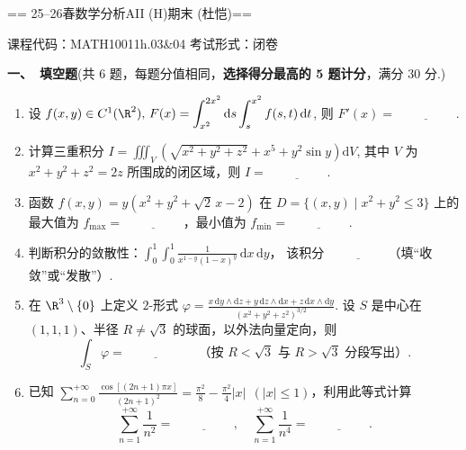 
== 25--26春数学分析AII (H)期末 (杜恺)==

\begin{center}
课程代码：MATH10011h.03&04 \quad 考试形式：闭卷
\end{center}

\textbf{一、\ 填空题}(共 6 题，每题分值相同，\textbf{选择得分最高的 5 题计分}，满分 30 分.)
\begin{enumerate}
\item 设 $f(x,y)\in C^1(\R^2),\,\displaystyle F(x)=\int_{x^2}^{2x^2}\mathrm{d} s\int_s^{x^2}f(s,t)\,\mathrm{d} t$,
则 $F'(x)=\underline{\hspace{2cm}}$.

\item 计算三重积分 $\displaystyle I=\iiint_V\left(\sqrt{x^2+y^2+z^2}+x^5+y^2\sin y\right)\mathrm{d} V$,
其中 \(V\) 为 \(x^2+y^2+z^2=2z\) 所围成的闭区域，则 \(I=\underline{\hspace{2cm}}\).

\item 函数 $\displaystyle f(x,y)=y\left(x^2+y^2+\sqrt{2}\,x-2\right)$ 在 \(D=\{(x,y)\mid x^2+y^2\le 3\}\) 上的最大值为 
$f_{\max}=\underline{\hspace{2cm}}$，最小值为 $f_{\min}=\underline{\hspace{2cm}}$.

\item 判断积分的敛散性：$\displaystyle \int_0^1\int_0^1\frac{1}{x^{1-y}(1-x)^y}\,\mathrm{d} x\,\mathrm{d} y$，
该积分 $\underline{\hspace{2cm}}$（填“收敛”或“发散”）.

\item 在 \(\R^3\setminus\{0\}\) 上定义 \(2\)-形式 $\displaystyle \varphi=
\frac{x\,\mathrm{d}y\wedge \mathrm{d}z+y\,\mathrm{d}z\wedge\mathrm{d}x+z\,\mathrm{d}x\wedge \mathrm{d}y}
{\left(x^2+y^2+z^2\right)^{3/2}}$.
设 \(S\) 是中心在 \((1,1,1)\)、半径 \(R\ne\sqrt{3}\) 的球面，以外法向量定向，则
\[
\int_S\varphi=\underline{\hspace{2cm}} \quad \text{（按 \(R<\sqrt{3}\) 与 \(R>\sqrt{3}\) 分段写出）}.
\]

\item 已知 $\displaystyle \sum_{n=0}^{+\infty}\frac{\cos\left[(2n+1)\pi x\right]}{(2n+1)^2}
=\frac{\pi^2}{8}-\frac{\pi^2}{4}|x|\ \ (|x|\le 1)$，利用此等式计算
\[
\sum_{n=1}^{+\infty}\frac{1}{n^2}=\underline{\hspace{2cm}},
\quad
\sum_{n=1}^{+\infty}\frac{1}{n^4}=\underline{\hspace{2cm}}.
\]
\end{enumerate}

